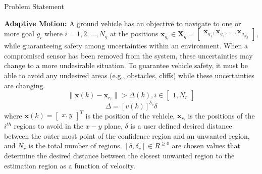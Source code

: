 \begin{section}{Problem Statement}
\begin{problem} \label{problem2} {\textbf{Adaptive Motion:}} 
A ground vehicle has an objective to navigate to one or more goal $g_i$ where $i=1,2,\dots,N_g$ at the positions $\bm{x}_{g_i} \in \bm{X}_g =  \begin{bmatrix} \bm{x}_{g_1},\bm{x}_{g_2},\dots,\bm{x}_{g_{N_g}} \end{bmatrix}$, while guaranteeing safety among uncertainties within an environment. When a compromised sensor has been removed from the system, these uncertainties may change to a more undesirable situation. To guarantee vehicle safety, it must be able to avoid any undesired areas (e.g., obstacles, cliffs) while these uncertainties are changing.
	\begin{equation}
		\lVert {\bm{x}(k)-\bm{x}_{r_i}} \rVert >\Delta(k),  i \in \begin{bmatrix} 1,N_r \end{bmatrix}
	\end{equation}
	\begin{equation}
		\Delta=[v(k)]^{\delta_v}\delta
	\end{equation}
where $\bm{x}(k)={\begin{bmatrix} x,y \end{bmatrix}}^T$ is the position of the vehicle, $\bm{x}_{r_i}$ is the positions of the ${i}^{th}$ regions to avoid in the $x-y$ plane, $\delta$ is a user defined desired distance between the outer most point of the confidence region and an unwanted region, and $N_r$ is the total number of regions. $[\delta, \delta_v] \in R^{\geq0}$ are chosen values that determine the desired distance between the closest unwanted region to the estimation region as a function of velocity.





\end{problem}
\end{section}
